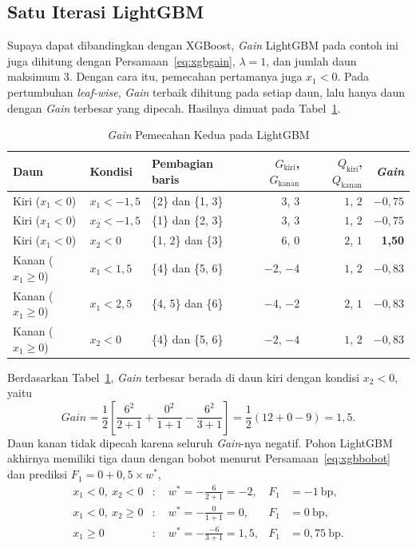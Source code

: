 \subsection{Satu Iterasi LightGBM}
Supaya dapat dibandingkan dengan XGBoost, \textit{Gain} LightGBM pada contoh ini
juga dihitung dengan Persamaan~\eqref{eq:xgbgain}, $\lambda = 1$, dan jumlah
daun maksimum 3. Dengan cara itu, pemecahan pertamanya juga $x_1 < 0$. Pada pertumbuhan \textit{leaf-wise}, \textit{Gain} terbaik dihitung
pada setiap daun, lalu hanya daun dengan \textit{Gain} terbesar yang dipecah.
Hasilnya dimuat pada Tabel~\ref{tab:man-lgbm}.

\begin{table}[htbp]
  \caption{\textit{Gain} Pemecahan Kedua pada LightGBM}
  \label{tab:man-lgbm}
  \centering
  \begingroup
  \footnotesize
  \setlength{\tabcolsep}{4pt}
  \begin{tabular}{|l|l|l|r|r|r|}
    \hline
    \textbf{Daun} & \textbf{Kondisi} & \textbf{Pembagian baris} & \textbf{$G_{\text{kiri}}$, $G_{\text{kanan}}$} & \textbf{$Q_{\text{kiri}}$, $Q_{\text{kanan}}$} & \textbf{\textit{Gain}} \\
    \hline
    Kiri ($x_1 < 0$) & $x_1 < -1{,}5$ & \{2\} dan \{1, 3\} & $3$, $3$ & $1$, $2$ & $-0{,}75$ \\
    Kiri ($x_1 < 0$) & $x_2 < -1{,}5$ & \{1\} dan \{2, 3\} & $3$, $3$ & $1$, $2$ & $-0{,}75$ \\
    Kiri ($x_1 < 0$) & $x_2 < 0$ & \{1, 2\} dan \{3\} & $6$, $0$ & $2$, $1$ & \textbf{1,50} \\
    Kanan ($x_1 \ge 0$) & $x_1 < 1{,}5$ & \{4\} dan \{5, 6\} & $-2$, $-4$ & $1$, $2$ & $-0{,}83$ \\
    Kanan ($x_1 \ge 0$) & $x_1 < 2{,}5$ & \{4, 5\} dan \{6\} & $-4$, $-2$ & $2$, $1$ & $-0{,}83$ \\
    Kanan ($x_1 \ge 0$) & $x_2 < 0$ & \{4\} dan \{5, 6\} & $-2$, $-4$ & $1$, $2$ & $-0{,}83$ \\
    \hline
  \end{tabular}
  \endgroup
\end{table}

Berdasarkan Tabel~\ref{tab:man-lgbm}, \textit{Gain} terbesar berada di daun
kiri dengan kondisi $x_2 < 0$, yaitu
\begin{equation*}
  \textit{Gain} = \frac{1}{2}\left[
    \frac{6^2}{2 + 1} + \frac{0^2}{1 + 1} - \frac{6^2}{3 + 1}
  \right] = \frac{1}{2}(12 + 0 - 9) = 1{,}5 .
\end{equation*}
Daun kanan tidak dipecah karena seluruh \textit{Gain}-nya negatif. Pohon
LightGBM akhirnya memiliki tiga daun dengan bobot menurut
Persamaan~\eqref{eq:xgbbobot} dan prediksi $F_1 = 0 + 0{,}5 \times w^{*}$,
\begin{equation*}
  \begin{aligned}
    x_1 < 0,\ x_2 < 0 &: \quad w^{*} = -\tfrac{6}{2 + 1} = -2, & F_1 &= -1~\text{bp},\\
    x_1 < 0,\ x_2 \ge 0 &: \quad w^{*} = -\tfrac{0}{1 + 1} = 0, & F_1 &= 0~\text{bp},\\
    x_1 \ge 0 &: \quad w^{*} = -\tfrac{-6}{3 + 1} = 1{,}5, & F_1 &= 0{,}75~\text{bp}.
  \end{aligned}
\end{equation*}

